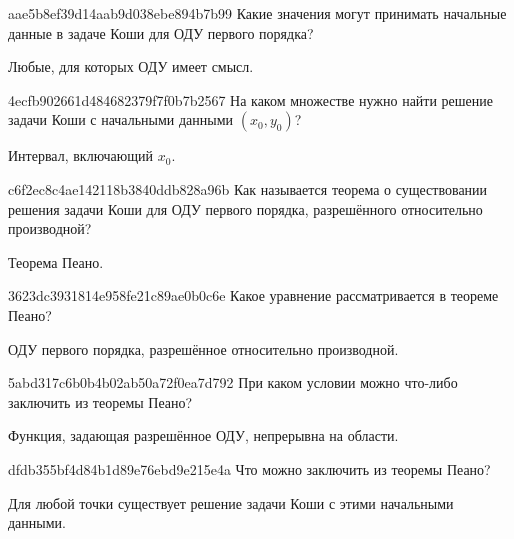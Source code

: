 \begin{note}{aae5b8ef39d14aab9d038ebe894b7b99}
    Какие значения могут принимать начальные данные в задаче Коши для ОДУ первого порядка?

    \begin{cloze}{1}
        Любые, для которых ОДУ имеет смысл.
    \end{cloze}
\end{note}

\begin{note}{4ecfb902661d484682379f7f0b7b2567}
    На каком множестве нужно найти решение задачи Коши с начальными данными \({ (x_0, y_0) }\)?

    \begin{cloze}{1}
        Интервал, включающий \({ x_0 }\).
    \end{cloze}
\end{note}

\begin{note}{c6f2ec8c4ae142118b3840ddb828a96b}
    Как называется теорема о существовании решения задачи Коши для ОДУ первого порядка, разрешённого относительно производной?

    \begin{cloze}{1}
        Теорема Пеано.
    \end{cloze}
\end{note}

\begin{note}{3623dc3931814e958fe21c89ae0b0c6e}
    Какое уравнение рассматривается в теореме Пеано?

    \begin{cloze}{1}
        ОДУ первого порядка, разрешённое относительно производной.
    \end{cloze}
\end{note}

\begin{note}{5abd317c6b0b4b02ab50a72f0ea7d792}
    При каком условии можно что-либо заключить из теоремы Пеано?

    \begin{cloze}{1}
        Функция, задающая разрешённое ОДУ, непрерывна на области.
    \end{cloze}
\end{note}

\begin{note}{dfdb355bf4d84b1d89e76ebd9e215e4a}
    Что можно заключить из теоремы Пеано?

    \begin{cloze}{1}
        Для любой точки существует решение задачи Коши с этими начальными данными.
    \end{cloze}
\end{note}

